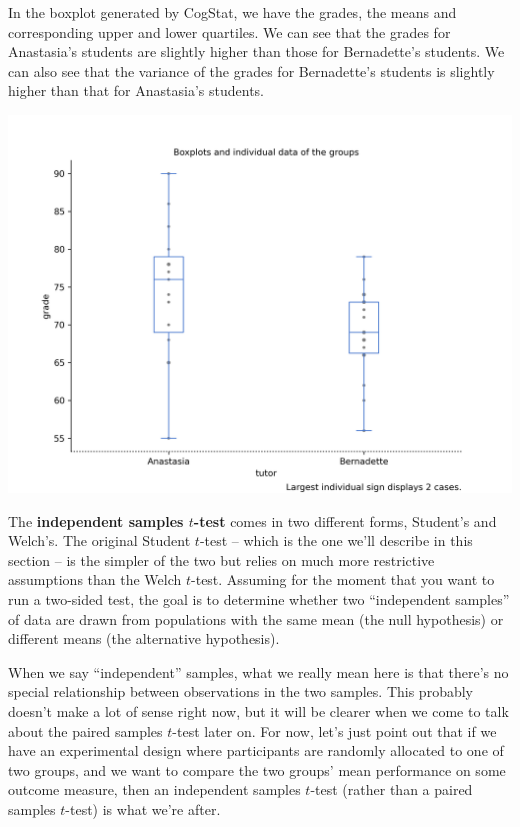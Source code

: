 \documentclass[
]{book}
\theoremstyle{definition}
\theoremstyle{definition}
\theoremstyle{definition}
\theoremstyle{definition}
\theoremstyle{remark}
\begin{document}
In the boxplot generated by CogStat, we have the grades, the means and corresponding upper and lower quartiles. We can see that the grades for Anastasia's students are slightly higher than those for Bernadette's students. We can also see that the variance of the grades for Bernadette's students is slightly higher than that for Anastasia's students.

\begin{center}\includegraphics[width=0.66\linewidth]{resources/image/cogstatharpoboxplot} \end{center}

The \textbf{independent samples \(t\)-test} comes in two different forms, Student's and Welch's. The original Student \(t\)-test -- which is the one we'll describe in this section -- is the simpler of the two but relies on much more restrictive assumptions than the Welch \(t\)-test. Assuming for the moment that you want to run a two-sided test, the goal is to determine whether two ``independent samples'' of data are drawn from populations with the same mean (the null hypothesis) or different means (the alternative hypothesis).

When we say ``independent'' samples, what we really mean here is that there's no special relationship between observations in the two samples. This probably doesn't make a lot of sense right now, but it will be clearer when we come to talk about the paired samples \(t\)-test later on. For now, let's just point out that if we have an experimental design where participants are randomly allocated to one of two groups, and we want to compare the two groups' mean performance on some outcome measure, then an independent samples \(t\)-test (rather than a paired samples \(t\)-test) is what we're after.
\end{document}
